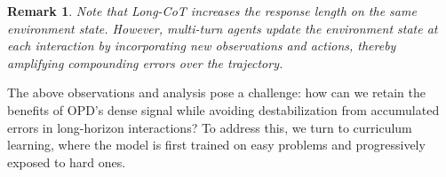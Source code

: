 \documentclass{article} %
\newtheorem{remark}{Remark}
\begin{document}






\begin{remark}Note that Long-CoT increases the response length on the same environment state. 
However, multi-turn agents update the environment state at each interaction by incorporating new observations and actions, thereby amplifying compounding errors over the trajectory.
\end{remark}

The above observations and analysis pose a challenge: how can we retain the benefits of OPD’s dense signal while avoiding destabilization from accumulated errors in long-horizon interactions?
To address this, we turn to curriculum learning, where the model is first trained on easy problems and progressively exposed to hard ones. 
\end{document}
